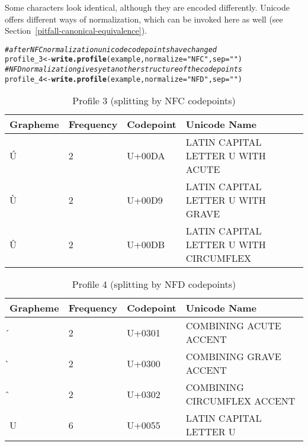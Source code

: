 \documentclass[output=inprep,
		biblatex
		]{LSP/langsci}\usepackage[]{graphicx}\usepackage[]{color}
\makeatletter
\newcommand{\hlstr}[1]{\textcolor[rgb]{0.192,0.494,0.8}{#1}}%
\newcommand{\hlcom}[1]{\textcolor[rgb]{0.678,0.584,0.686}{\textit{#1}}}%
\newcommand{\hlstd}[1]{\textcolor[rgb]{0.345,0.345,0.345}{#1}}%
\newcommand{\hlkwb}[1]{\textcolor[rgb]{0.69,0.353,0.396}{#1}}%
\newcommand{\hlkwc}[1]{\textcolor[rgb]{0.333,0.667,0.333}{#1}}%
\newcommand{\hlkwd}[1]{\textcolor[rgb]{0.737,0.353,0.396}{\textbf{#1}}}%
\newenvironment{kframe}{%
 \def\at@end@of@kframe{}%
 \ifinner\ifhmode%
  \def\at@end@of@kframe{\end{minipage}}%
  \begin{minipage}{\columnwidth}%
 \fi\fi%
 \def\FrameCommand##1{\hskip\@totalleftmargin \hskip-\fboxsep
 \colorbox{shadecolor}{##1}\hskip-\fboxsep
     \hskip-\linewidth \hskip-\@totalleftmargin \hskip\columnwidth}%
 \MakeFramed {\advance\hsize-\width
   \@totalleftmargin\z@ \linewidth\hsize
   \@setminipage}}%
 {\par\unskip\endMakeFramed%
 \at@end@of@kframe}
\newenvironment{knitrout}{}{} %
\makeatother
\begin{document}
\noindent Some characters look identical, although they are encoded differently. 
Unicode offers different ways of normalization, which can be invoked here as 
well (see Section~\ref{pitfall-canonical-equivalence}).

\begin{knitrout}\footnotesize
{}\color{fgcolor}\begin{kframe}
\begin{alltt}
\hlcom{# after NFC normalization unicode codepoints have changed}
\hlstd{profile_3} \hlkwb{<-} \hlkwd{write.profile}\hlstd{(example,} \hlkwc{normalize} \hlstd{=} \hlstr{"NFC"}\hlstd{,} \hlkwc{sep} \hlstd{=} \hlstr{""}\hlstd{)}
\hlcom{# NFD normalization gives yet another structure of the codepoints}
\hlstd{profile_4} \hlkwb{<-} \hlkwd{write.profile}\hlstd{(example,} \hlkwc{normalize} \hlstd{=} \hlstr{"NFD"}\hlstd{,} \hlkwc{sep} \hlstd{=} \hlstr{""}\hlstd{)}
\end{alltt}
\end{kframe}
\end{knitrout}

\begin{table}[H]
\centering
\begingroup\scriptsize
\begin{tabular}{llll}
  \toprule
Grapheme & Frequency & Codepoint & Unicode Name \\ 
  \midrule
Ú & 2 & U+00DA & LATIN CAPITAL LETTER U WITH ACUTE \\ 
  Ù & 2 & U+00D9 & LATIN CAPITAL LETTER U WITH GRAVE \\ 
  Û & 2 & U+00DB & LATIN CAPITAL LETTER U WITH CIRCUMFLEX \\ 
   \bottomrule
\end{tabular}
\endgroup
\caption{Profile 3 (splitting by NFC codepoints)} 
\label{tab:profile3}
\end{table}


\begin{table}[H]
\centering
\begingroup\scriptsize
\begin{tabular}{llll}
  \toprule
Grapheme & Frequency & Codepoint & Unicode Name \\ 
  \midrule
́ & 2 & U+0301 & COMBINING ACUTE ACCENT \\ 
  ̀ & 2 & U+0300 & COMBINING GRAVE ACCENT \\ 
  ̂ & 2 & U+0302 & COMBINING CIRCUMFLEX ACCENT \\ 
  U & 6 & U+0055 & LATIN CAPITAL LETTER U \\ 
   \bottomrule
\end{tabular}
\endgroup
\caption{Profile 4 (splitting by NFD codepoints)} 
\label{tab:profile4}
\end{table}
\end{document}
